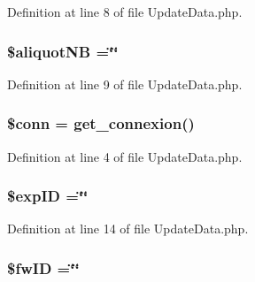 Definition at line 8 of file Update\-Data.\-php.

\hypertarget{_update_data_8php_a1544720fdad7b397bd59e591e83a2d3c}{
\subsubsection[{\$aliquot\-N\-B}]{\setlength{\rightskip}{0pt plus 5cm}\$aliquot\-N\-B =\char`\"{}\char`\"{}}}\label{_update_data_8php_a1544720fdad7b397bd59e591e83a2d3c}


Definition at line 9 of file Update\-Data.\-php.

\hypertarget{_update_data_8php_aa8a5a87b9c1a6a0819b88447cbe41877}{
\subsubsection[{\$conn}]{\setlength{\rightskip}{0pt plus 5cm}\$conn = {\bf get\-\_\-connexion}()}}\label{_update_data_8php_aa8a5a87b9c1a6a0819b88447cbe41877}


Definition at line 4 of file Update\-Data.\-php.

\hypertarget{_update_data_8php_ae384d32e62e85e587cd27bf249ed3db3}{
\subsubsection[{\$exp\-I\-D}]{\setlength{\rightskip}{0pt plus 5cm}\${\bf exp\-I\-D} =\char`\"{}\char`\"{}}}\label{_update_data_8php_ae384d32e62e85e587cd27bf249ed3db3}


Definition at line 14 of file Update\-Data.\-php.

\hypertarget{_update_data_8php_a7bb49988a552894a7bd314eaff592cb1}{
\subsubsection[{\$fw\-I\-D}]{\setlength{\rightskip}{0pt plus 5cm}\$fw\-I\-D =\char`\"{}\char`\"{}}}\label{_update_data_8php_a7bb49988a552894a7bd314eaff592cb1}


